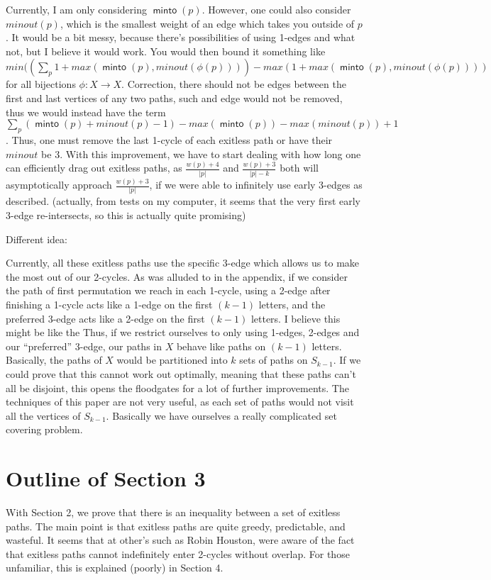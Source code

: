 \documentclass{article}
\theoremstyle{definition}
\DeclareMathOperator{\minto}{\bm{\mathsf{minto}}}
\begin{document}
{Currently, I am only considering $\minto(p)$. However, one could also consider $minout(p)$, which is the smallest weight of an edge which takes you outside of $p$. It would be a bit messy, because there's possibilities of using 1-edges and what not, but I believe it would work. You would then bound it something like $min( \left(\sum_p 1+max( \minto(p), minout(\phi(p))) \right) - max( 1+max(\minto(p),minout(\phi(p))) )$ for all bijections $\phi: X \to X$. Correction, there should not be edges between the first and last vertices of any two paths, such and edge would not be removed, thus we would instead have the term $\sum_p (\minto(p) + minout(p) -1) - max(\minto(p))-max(minout(p))+1$. Thus, one must remove the last 1-cycle of each exitless path or have their $minout$ be 3. With this improvement, we have to start dealing with how long one can efficiently drag out exitless paths, as $\frac{w(p) + 4}{|p|}$ and $\frac{w(p)+3}{|p|-k}$ both will asymptotically approach $\frac{w(p) + 3}{|p|}$, if we were able to infinitely use early 3-edges as described. (actually, from tests on my computer, it seems that the very first early 3-edge re-intersects, so this is actually quite promising)


Different idea:

Currently, all these exitless paths use the specific 3-edge which allows us to make the most out of our 2-cycles. As was alluded to in the appendix, if we consider the path of first permutation we reach in each 1-cycle, using a 2-edge after finishing a 1-cycle acts like a 1-edge on the first $(k-1)$ letters, and the preferred 3-edge acts like a 2-edge on the first $(k-1)$ letters. I believe this might be like the  Thus, if we restrict ourselves to only using 1-edges, 2-edges and our ``preferred'' 3-edge, our paths in $X$ behave like paths on $(k-1)$ letters. Basically, the paths of $X$ would be partitioned into $k$ sets of paths on $S_{k-1}$. If we could prove that this cannot work out optimally, meaning that these paths can't all be disjoint, this opens the floodgates for a lot of further improvements. The techniques of this paper are not very useful, as each set of paths would not visit all the vertices of $S_{k-1}$. Basically we have ourselves a really complicated set covering problem.

\section{Outline of Section 3}

With Section 2, we prove that there is an inequality between a set of exitless paths. The main point is that exitless paths are quite greedy, predictable, and wasteful. It seems that at other's such as Robin Houston, were aware of the fact that exitless paths cannot indefinitely enter 2-cycles without overlap. For those unfamiliar, this is explained (poorly) in Section 4.

}
\end{document}
